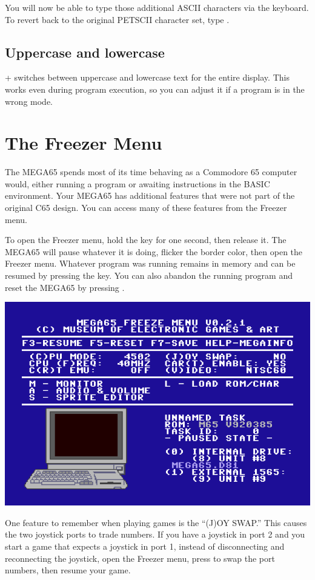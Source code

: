 You will now be able to type those additional ASCII characters via the keyboard. To revert back to the original PETSCII character set, type .

\subsection{Uppercase and lowercase}

\megasymbolkey +  switches between uppercase and lowercase text for the entire display. This works even during program execution, so you can adjust it if a program is in the wrong mode.


\newpage
\section{The Freezer Menu}
\label{sec:freezer}

The MEGA65 spends most of its time behaving as a Commodore 65 computer would, either running a program or awaiting instructions in the BASIC environment. Your MEGA65 has additional features that were not part of the original C65 design. You can access many of these features from the Freezer menu.

To open the Freezer menu, hold the  key for one second, then release it. The MEGA65 will pause whatever it is doing, flicker the border color, then open the Freezer menu. Whatever program was running remains in memory and can be resumed by pressing the  key. You can also abandon the running program and reset the MEGA65 by pressing .

\begin{center}
  \includegraphics[width=0.7\linewidth]{images/freezer.png}
\end{center}

One feature to remember when playing games is the ``(J)OY SWAP.'' This causes the two joystick ports to trade numbers. If you have a joystick in port 2 and you start a game that expects a joystick in port 1, instead of disconnecting and reconnecting the joystick, open the Freezer menu, press  to swap the port numbers, then resume your game.

